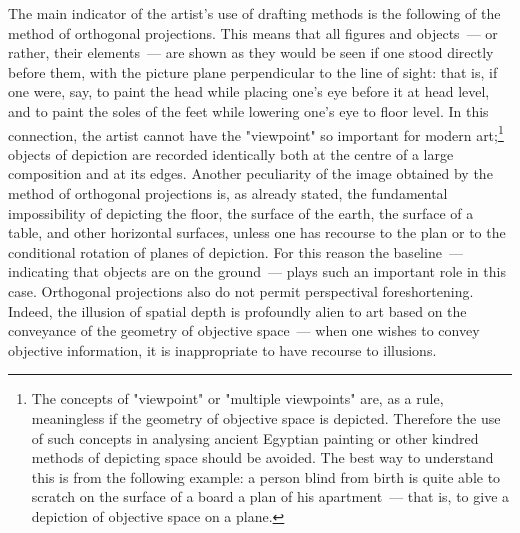 The main indicator of the artist's use of drafting methods is the following of the method
of orthogonal projections. This means that all figures and objects~--- or rather, their
elements~--- are shown as they would be seen if one stood directly before them, with the
picture plane perpendicular to the line of sight: that is, if one were, say, to paint the
head while placing one's eye before it at head level, and to paint the soles of the feet
while lowering one's eye to floor level. In this connection, the artist cannot have the
"viewpoint" so important for modern art;\footnote{%
  The concepts of "viewpoint" or "multiple viewpoints" are, as a rule, meaningless if
  the geometry of objective space is depicted. Therefore the use of such concepts in
  analysing ancient Egyptian painting or other kindred methods of depicting space
  should be avoided. The best way to understand this is from the following example:
  a person blind from birth is quite able to scratch on the surface of a board a plan
  of his apartment~--- that is, to give a depiction of objective space on a plane.}
objects of depiction are recorded identically both at the centre of a large composition
and at its edges. Another peculiarity of the image obtained by the method of orthogonal
projections is, as already stated, the fundamental impossibility of depicting the floor,
the surface of the earth, the surface of a table, and other horizontal surfaces, unless one
has recourse to the plan or to the conditional rotation of planes of depiction. For this
reason the baseline~--- indicating that objects are on the ground~--- plays such an
important role in this case. Orthogonal projections also do not permit perspectival
foreshortening. Indeed, the illusion of spatial depth is profoundly alien to art based on
the conveyance of the geometry of objective space~--- when one wishes to convey objective
information, it is inappropriate to have recourse to illusions.


